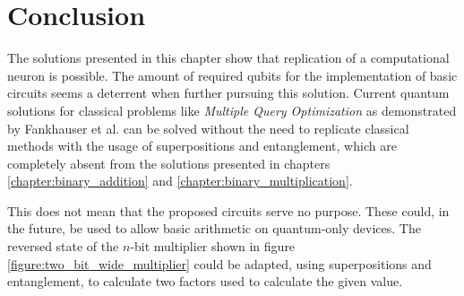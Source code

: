 \newpage


\section{Conclusion}

The solutions presented in this chapter show that replication of a computational neuron is possible. The amount of required qubits for the implementation of basic circuits seems a deterrent when further pursuing this solution. Current quantum solutions for classical problems like \emph{Multiple Query Optimization} as demonstrated by Fankhauser et al.\cite{fankhauser_multiple_2021} can be solved without the need to replicate classical methods with the usage of superpositions and entanglement, which are completely absent from the solutions presented in chapters \ref{chapter:binary_addition} and \ref{chapter:binary_multiplication}. 

This does not mean that the proposed circuits serve no purpose. These could, in the future, be used to allow basic arithmetic on quantum-only devices. The reversed state of the $n$-bit multiplier shown in figure \ref{figure:two_bit_wide_multiplier} could be adapted, using superpositions and entanglement, to calculate two factors used to calculate the given value.
